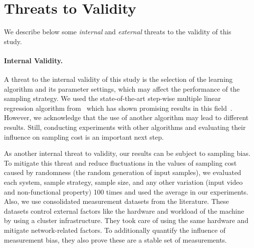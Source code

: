 \section{Threats to Validity} \label{threats}

We describe below some \textit{internal} and \textit{external} threats to the validity of this study.

\paragraph{Internal Validity.}
A threat to the internal validity of this study is the selection of the learning algorithm and its parameter settings, which may affect the performance of the sampling strategy.
We used the state-of-the-art step-wise multiple linear regression algorithm from~\cite{siegmund2015FSE} which has shown promising results in this field~\cite{kaltenecker2019,julianasurvey,pereira2020}.
However, we acknowledge that the use of another algorithm may lead to different results.
Still, conducting experiments with other algorithms and 
evaluating their influence on sampling cost is an important next step.

As another internal threat to validity, our results can be subject to sampling bias.
To mitigate this threat and reduce fluctuations in the values of sampling cost caused by randomness (\eg the random generation of input samples), we evaluated each system, sample strategy, sample size, and any other variation (\eg input video and non-functional property) 100 times and used the average in our experiments.
Also, we use consolidated measurement datasets from the literature.
These datasets control external factors like the hardware and workload of the machine by using a cluster infrastructure. They took care of using the same hardware and mitigate network-related factors. To additionally quantify the influence of measurement bias, they also prove these are a stable set of measurements.


